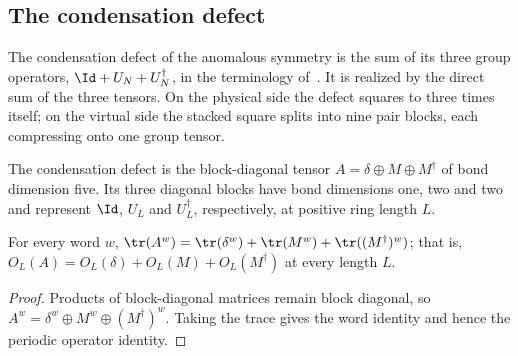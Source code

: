 \subsection{The condensation defect}%
\label{sec:asymex_z3anomalous_defect}

The condensation defect of the anomalous symmetry is the sum of its three
group operators, $\Id+U_N+U_N^\dagger$, in the terminology
of~\cite{Roumpedakis2023Condensation}. It is realized by the direct sum
of the three tensors. On the physical side the defect squares to three
times itself; on the virtual side the stacked square splits into nine
pair blocks, each compressing onto one group tensor.

\begin{definition}
    \label{def:asymex_z3anomalous_defect}
    \leanok
    The condensation defect is the block-diagonal tensor
    $A=\delta\oplus M\oplus M^\dagger$ of bond dimension five.
    Its three diagonal blocks have bond dimensions one, two and two
    and represent $\Id$, $U_L$ and $U_L^\dagger$, respectively,
    at positive ring length $L$.
\end{definition}

\begin{lemma}
    \label{thm:asymex_z3anomalous_defect_sum}
    \leanok
    For every word $w$, $\tr(A^w)=\tr(\delta^w)+\tr(M^w)+\tr((M^\dagger)^w)$; that is,
    $O_L(A)=O_L(\delta)+O_L(M)+O_L(M^\dagger)$ at every length $L$.
\end{lemma}

\begin{proof}
    \leanok
    Products of block-diagonal matrices remain block diagonal, so
    $A^w=\delta^w\oplus M^w\oplus(M^\dagger)^w$.
    Taking the trace gives the word identity and hence the periodic
    operator identity.
\end{proof}

